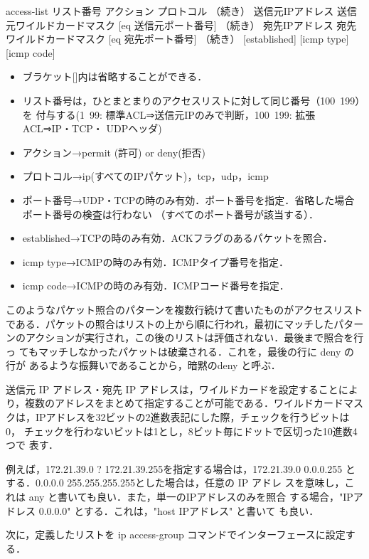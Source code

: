 \begin{cli}
[拡張ACL書式]
access-list  リスト番号  アクション  プロトコル
（続き） 送信元IPアドレス  送信元ワイルドカードマスク [eq  送信元ポート番号]
（続き）   宛先IPアドレス    宛先ワイルドカードマスク [eq    宛先ポート番号]
（続き）   [established] [icmp type] [icmp code]
\end{cli}

\begin{itemize}
 \item ブラケット[]内は省略することができる．
 \item リスト番号は，ひとまとまりのアクセスリストに対して同じ番号（100~199）を
付与する(1~99: 標準ACL⇒送信元IPのみで判断，100~199: 拡張ACL⇒IP・TCP・
       UDPヘッダ)
 \item アクション→permit (許可) or deny(拒否)
 \item プロトコル→ip(すべてのIPパケット)，tcp，udp，icmp
 \item ポート番号→UDP・TCPの時のみ有効．ポート番号を指定．省略した場合ポート番号の検査は行わない
（すべてのポート番号が該当する）．
 \item established→TCPの時のみ有効．ACKフラグのあるパケットを照合．
 \item icmp type→ICMPの時のみ有効．ICMPタイプ番号を指定．
 \item icmp code→ICMPの時のみ有効．ICMPコード番号を指定．
\end{itemize}

このようなパケット照合のパターンを複数行続けて書いたものがアクセスリスト
である．パケットの照合はリストの上から順に行われ，最初にマッチしたパター
ンのアクションが実行され，この後のリストは評価されない．最後まで照合を行っ
てもマッチしなかったパケットは破棄される．これを，最後の行に deny の行が
あるような振舞いであることから，暗黙のdeny と呼ぶ．

送信元 IP アドレス・宛先 IP アドレスは，ワイルドカードを設定することによ
り，複数のアドレスをまとめて指定することが可能である．ワイルドカードマス
クは，IPアドレスを32ビットの2進数表記にした際，チェックを行うビットは0，
チェックを行わないビットは1とし，8ビット毎にドットで区切った10進数4つで
表す．

例えば，172.21.39.0 ? 172.21.39.255を指定する場合は，172.21.39.0
0.0.0.255 とする．0.0.0.0 255.255.255.255とした場合は，任意の IP アドレ
スを意味し，これは any と書いても良い．また，単一のIPアドレスのみを照合
する場合，"IPアドレス  0.0.0.0" とする．これは，"host  IPアドレス" と書いて
も良い．

次に，定義したリストを ip access-group コマンドでインターフェースに設定する．

